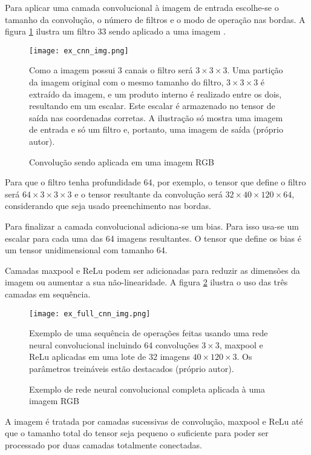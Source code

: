 Para aplicar uma camada convolucional à imagem de entrada escolhe-se o tamanho
da convolução, o número de filtros e o modo de operação nas bordas. A figura
\ref{fig:ex_cnn_img} ilustra um filtro 33 sendo aplicado a uma imagem
.

\begin{figure}[!htb]
	\centering
	\texttt{[image: ex\_cnn\_img.png]}
	\caption{Convolução sendo aplicada em uma imagem RGB}
	\label{fig:ex_cnn_img}
	Como a imagem possui 3 canais o filtro será $3 \times 3 \times 3$.
	Uma partição da imagem original com o mesmo tamanho do filtro,
	$3 \times 3 \times 3$ é extraído da imagem, e um
	produto interno é realizado entre os dois, resultando em um escalar. Este
	escalar é armazenado no tensor de saída nas coordenadas corretas. A
	ilustração só mostra uma imagem de entrada e só um filtro e, portanto, uma
	imagem de saída (próprio autor).
\end{figure}

Para que o filtro tenha profundidade 64, por exemplo, o tensor que define o
filtro será $64 \times 3 \times 3 \times 3$ e o tensor resultante da
convolução será $32 \times 40 \times 120 \times 64$,
considerando que seja usado preenchimento nas bordas.

Para finalizar a camada convolucional adiciona-se um bias. Para isso usa-se um
escalar para cada uma das 64 imagens resultantes. O tensor que define os bias é
um tensor unidimensional com tamanho 64.

Camadas maxpool e ReLu podem ser adicionadas para reduzir as dimensões da imagem
ou aumentar a sua não-linearidade. A figura \ref{fig:ex_full_cnn_img}
ilustra o uso das três camadas em sequência.

\begin{figure}[!htb]
	\centering
	\texttt{[image: ex\_full\_cnn\_img.png]}
	\caption{Exemplo de rede neural convolucional completa aplicada à uma imagem
	RGB}
	\label{fig:ex_full_cnn_img}
	Exemplo de uma sequência de operações feitas usando uma rede neural
	convolucional incluindo 64 convoluções $3 \times 3$, maxpool e ReLu
	aplicadas em uma
	lote de 32 imagens $40 \times 120 \times 3$. Os parâmetros treináveis
	estão destacados (próprio autor).
\end{figure}

A imagem é tratada por camadas sucessivas de convolução, maxpool e ReLu até que
o tamanho total do tensor seja pequeno o suficiente para poder ser processado
por duas camadas totalmente conectadas. 

